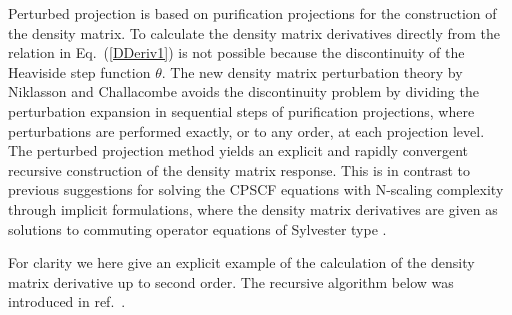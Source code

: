 \documentclass[prl,aps,letterpaper,twocolumn,showpacs,twocolumngrid,superbib]{revtex4}
\begin{document}
Perturbed projection is based on purification projections for the 
construction of the density matrix. To calculate the
density matrix derivatives directly from the relation in Eq.\ (\ref{DDeriv1})
is not possible because the discontinuity of the Heaviside step function $\theta$.
The new density matrix perturbation theory by Niklasson and Challacombe
\cite{ANiklasson04} avoids the discontinuity problem
by dividing the perturbation expansion in sequential steps of 
purification projections, where perturbations are performed exactly, or to 
any order, at each projection level. The perturbed projection method yields
an explicit and rapidly convergent recursive construction of
the density matrix response. This is in contrast to previous suggestions for
solving the CPSCF equations with N-scaling complexity through implicit
formulations, where the density matrix derivatives are given as solutions
to commuting operator equations of Sylvester type 
\cite{Ochsenfeld97,Helgaker_2001}.


For clarity we here give an explicit example of the calculation
of the density matrix derivative up to second order. The recursive
algorithm below was introduced in ref.\ \cite{ANiklasson04}.
\end{document}
